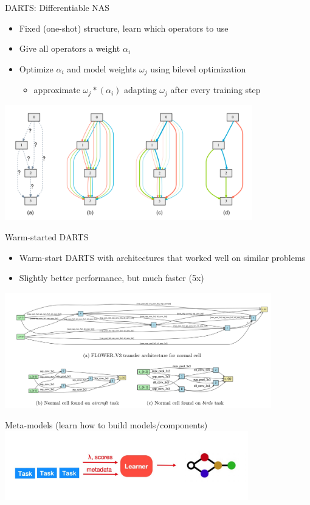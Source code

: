 \begin{frame}{DARTS: Differentiable NAS}
    \begin{itemize}
        \item Fixed (one-shot) structure, learn which operators to use
        \item Give all operators a weight $\alpha_i$
        \item Optimize $\alpha_i$ and model weights $\omega_j$ using bilevel optimization
        \begin{itemize}
            \item approximate $\omega_j*(\alpha_i)$ adapting $\omega_j$ after every training step
        \end{itemize}
    \end{itemize}
    \centering\includegraphics[height=5cm]{image/Picture2.png}
\end{frame}

\begin{frame}{Warm-started DARTS}
    \begin{itemize}
        \item Warm-start DARTS with architectures that worked well on similar problems
        \item Slightly better performance, but much faster (5x)
    \end{itemize}
    \centering\includegraphics[height=5cm]{image/Picture3.png}
\end{frame}

\begin{frame}{Meta-models}
    (learn how to build models/components)
    \centering\includegraphics[height=3cm]{image/img233402.jpg}
\end{frame}

